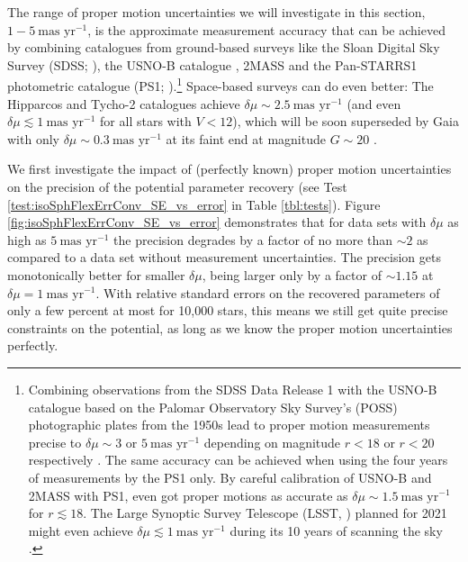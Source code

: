 \documentclass[iop,revtex4,numberedappendix,appendixfloats]{emulateapj}
\begin{document}
The range of proper motion uncertainties we will investigate in this section, $1-5~\text{mas yr}^{-1}$, is the approximate measurement accuracy that can be achieved by combining catalogues from ground-based surveys like the Sloan Digital Sky Survey (SDSS; \citealt{2003AJ....126.2081A}), the USNO-B catalogue \citep{2003AJ....125..984M}, 2MASS \citep{2006AJ....131.1163S} and the Pan-STARRS1 photometric catalogue (PS1; \citealt{2010SPIE.7733E..0EK}).\footnote{Combining observations from the SDSS Data Release 1 with the USNO-B catalogue based on the Palomar Observatory Sky Survey's (POSS) photographic plates from the 1950s lead to proper motion measurements precise to $\delta\mu\sim3$ or $5~\text{mas yr}^{-1}$ depending on magnitude $r<18$ or $r<20$ respectively \citep{2004AJ....127.3034M,2008AJ....136..895M,2004ApJS..152..103G}. The same accuracy can be achieved when using the four years of measurements by the PS1 only. By careful calibration of USNO-B and 2MASS with PS1, \citet{2015ApJ...809...59S} even got proper motions as accurate as $\delta \mu\sim1.5~\text{mas yr}^{-1}$ for $r\lesssim 18$. The Large Synoptic Survey Telescope (LSST, \citealt{2008arXiv0805.2366I}) planned for 2021 might even achieve $\delta\mu \lesssim 1~\text{mas yr}^{-1}$ during its 10 years of scanning the sky \citep{2008IAUS..248..537I}.} Space-based surveys can do even better: The Hipparcos \citep{1997ESASP1200.....E} and Tycho-2 \citep{2000A&A...355L..27H} catalogues achieve $\delta \mu\sim2.5~\text{mas yr}^{-1}$ (and even $\delta\mu \lesssim 1~\text{mas yr}^{-1}$ for all stars with $V <12$), which will be soon superseded by Gaia with only $\delta \mu\sim0.3~\text{mas yr}^{-1}$ at its faint end at magnitude $G\sim20$ \citep{2014EAS....67...23D}.

We first investigate the impact of (perfectly known) proper motion uncertainties on the precision of the potential parameter recovery (see Test \ref{test:isoSphFlexErrConv_SE_vs_error} in Table \ref{tbl:tests}). Figure \ref{fig:isoSphFlexErrConv_SE_vs_error} demonstrates that for data sets with $\delta \mu$ as high as $5~\text{mas yr}^{-1}$ the precision degrades by a factor of no more than $\sim2$ as compared to a data set without measurement uncertainties. The precision gets monotonically better for smaller $\delta \mu$, being larger only by a factor of $\sim 1.15$ at $\delta \mu=1~\text{mas yr}^{-1}$. With relative standard errors on the recovered parameters of only a few percent at most for 10,000 stars, this means we still get quite precise constraints on the potential, as long as we know the proper motion uncertainties perfectly.
\end{document}
